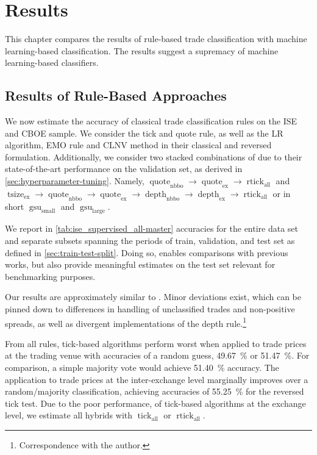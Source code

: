 \section{Results}\label{sec:results}

This chapter compares the results of rule-based trade classification with machine learning-based classification. The results suggest a supremacy of machine learning-based classifiers.

\subsection{Results of Rule-Based Approaches}\label{sec:result-of-rule-based-approaches}

We now estimate the accuracy of classical trade classification rules on the \gls{ISE} and \gls{CBOE} sample. We consider the tick and quote rule, as well as the \gls{LR} algorithm, \gls{EMO} rule and \gls{CLNV} method in their classical and reversed formulation. Additionally, we consider two stacked combinations of \textcite[][12--14]{grauerOptionTradeClassification2022} due to their state-of-the-art performance on the validation set, as derived in \cref{sec:hyperparameter-tuning}. Namely, $\operatorname{quote}_{\mathrm{nbbo}} \to \operatorname{quote}_{\mathrm{ex}} \to \operatorname{rtick}_{\mathrm{all}}$ and $\operatorname{tsize}_{\mathrm{ex}} \to \operatorname{quote}_{\mathrm{nbbo}} \to \operatorname{quote}_{\mathrm{ex}} \to \operatorname{depth}_{\mathrm{nbbo}} \to \operatorname{depth}_{\mathrm{ex}} \to \operatorname{rtick}_{\mathrm{all}}$ or in short $\operatorname{gsu}_{\mathrm{small}}$ and $\operatorname{gsu}_{\mathrm{large}}$.

We report in \cref{tab:ise_supervised_all-master} accuracies for the entire data set and separate subsets spanning the periods of train, validation, and test set as defined in \cref{sec:train-test-split}. Doing so, enables comparisons with previous works, but also provide meaningful estimates on the test set relevant for benchmarking purposes.

Our results are approximately similar to \textcite[][29--33]{grauerOptionTradeClassification2022}. Minor deviations exist, which can be pinned down to differences in handling of unclassified trades and non-positive spreads, as well as divergent implementations of the depth rule.\footnote{Correspondence with the author.}

From all rules, tick-based algorithms perform worst when applied to trade prices at the trading venue with accuracies of a random guess, \SI{49.67}{\percent} or \SI{51.47}{\percent}.  For comparison, a simple majority vote would achieve \SI{51.40}{\percent} accuracy. The application to trade prices at the inter-exchange level marginally improves over a random/majority classification, achieving accuracies of \SI{55.25}{\percent}  for the reversed tick test. Due to the poor performance, of tick-based algorithms at the exchange level, we estimate all hybrids with $\operatorname{tick}_{\mathrm{all}}$ or $\operatorname{rtick}_{\mathrm{all}}$.

